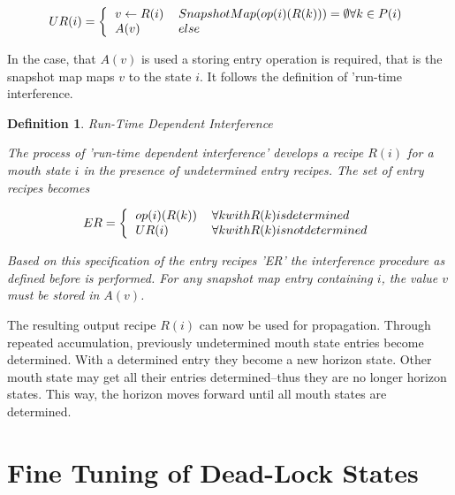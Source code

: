 \documentclass[12pt,a4paper]{scrartcl}
\theoremstyle{break}
\newtheorem{definition}{Definition}
\begin{document}
\begin{equation}
    UR(i) = \left \{ 
        \begin{tabular}{ll}
            $v \leftarrow R(i)$ & $SnapshotMap(op(i)(R(k))) = \emptyset \forall k \in P(i)$ \\
            $A(v)$              & $else$
        \end{tabular}
            \right .
\end{equation}

In the case, that $A(v)$ is used a storing entry operation is required, that is
the snapshot map maps $v$ to the state $i$. It follows the definition of
'run-time interference.

\begin{definition}
Run-Time Dependent Interference

The process of 'run-time dependent interference' develops a recipe $R(i)$
for a mouth state $i$ in the presence of undetermined entry recipes. The
set of entry recipes becomes

\begin{equation}
    ER = \left \{
        \begin{tabular}{ll}
            $op(i)(R(k))$ & $\forall k with R(k) is determined$ \\
            $UR(i)$       & $\forall k with R(k) is not determined$ \\
        \end{tabular}
        \right .
\end{equation}

Based on this specification of the entry recipes 'ER' the interference
procedure as defined before is performed. For any snapshot map entry
containing $i$, the value $v$ must be stored in $A(v)$.
\end{definition}

The resulting output recipe $R(i)$ can now be used for propagation. Through
repeated accumulation, previously undetermined mouth state entries become
determined. With a determined entry they become a new horizon state. Other
mouth state may get all their entries determined--thus they are no longer
horizon states. This way, the horizon moves forward until all mouth states are
determined. 

%
\section{Fine Tuning of Dead-Lock States}
\end{document}
